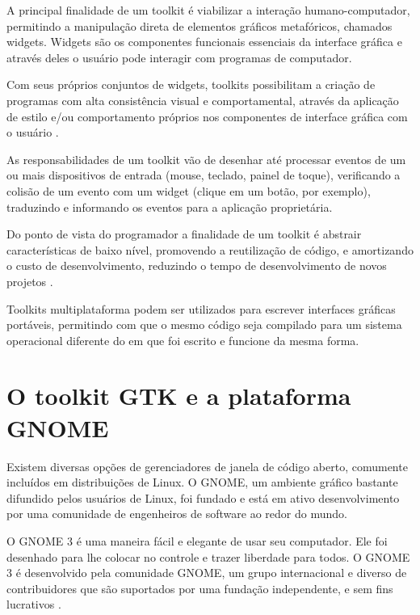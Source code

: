 A principal finalidade de um toolkit é viabilizar a interação humano-computador,
permitindo a manipulação direta de elementos gráficos metafóricos, chamados
widgets. Widgets são os componentes funcionais essenciais da interface gráfica e
através deles o usuário pode interagir com programas de computador.

Com seus próprios conjuntos de widgets, toolkits possibilitam a criação de
programas com alta consistência visual e comportamental, através da aplicação de
estilo e/ou comportamento próprios nos componentes de interface gráfica com o
usuário \cite{myers2000past}.

As responsabilidades de um toolkit vão de desenhar até processar eventos de um
ou mais dispositivos de entrada (mouse, teclado, painel de toque), verificando a
colisão de um evento com um widget (clique em um botão, por exemplo), traduzindo
e informando os eventos para a aplicação proprietária.

Do ponto de vista do programador a finalidade de um toolkit é abstrair
características de baixo nível, promovendo a reutilização de código, e
amortizando o custo de desenvolvimento, reduzindo o tempo de desenvolvimento de
novos projetos .

Toolkits multiplataforma podem ser utilizados para escrever interfaces gráficas
portáveis, permitindo com que o mesmo código seja compilado para um sistema
operacional diferente do em que foi escrito e funcione da mesma forma.

\section{O toolkit GTK e a plataforma GNOME}

Existem diversas opções de gerenciadores de janela de código aberto, comumente
incluídos em distribuições de Linux. O GNOME, um ambiente gráfico bastante
difundido pelos usuários de Linux, foi fundado e está em ativo desenvolvimento
por uma comunidade de engenheiros de software ao redor do mundo.

\begin{citacao}
    O GNOME 3 é uma maneira fácil e elegante de usar seu computador.
    Ele foi desenhado para lhe colocar no controle e trazer liberdade para
    todos. O GNOME 3 é desenvolvido pela comunidade GNOME, um grupo
    internacional e diverso de contribuidores que são suportados por uma
    fundação independente, e sem fins lucrativos \cite{gnome-org}.
\end{citacao}

